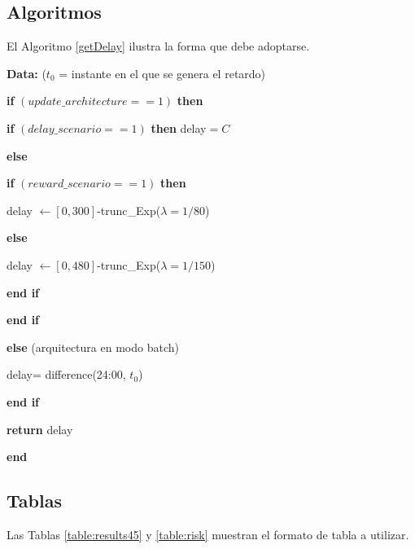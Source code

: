\documentclass[spanish,12pt, a4paper, twoside]{paper}
\begin{document}
\subsection{Algoritmos}

El Algoritmo \ref{getDelay} ilustra la forma que debe adoptarse. 
\begin{algorithm}[h]
{\bf  Data:} ($t_0$ = instante en el que se genera el retardo)
\medskip

\hspace{0.5em} {\bf if} $(update\_architecture==1)$ {\bf then} 

\hspace{1.5em} {\bf if} $(delay\_scenario==1)$ {\bf then} delay$=C$

\hspace{1.5em} {\bf else} 

\hspace{2.5em} {\bf if} $(reward\_scenario==1)$ {\bf then} 

\hspace{3.5em} delay $\leftarrow [0,300]$-trunc\_Exp($\lambda=1/80$)

\hspace{2.5em} {\bf else} 

\hspace{3.5em} delay $\leftarrow [0,480]$-trunc\_Exp($\lambda=1/150$)

\hspace{2.5em} {\bf end if}

\hspace{1.5em} {\bf end if}

\hspace{0.5em} {\bf else} (arquitectura en modo batch)

\hspace{1.5em} delay= difference(24:00, $t_0$)

\hspace{0.5em} {\bf end if}

\hspace{0.5em}  {\bf return} delay

{\bf end} 
\caption{$getDelay(t_0)$}
\label{getDelay}
\end{algorithm}


\subsection{Tablas}
Las Tablas \ref{table:results45} y \ref{table:risk} muestran el formato de tabla a utilizar.
\end{document}
